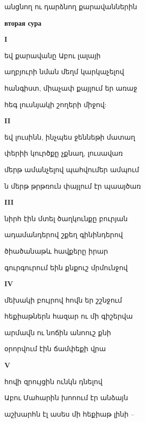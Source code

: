 անցնող ու դարձնող  քարավաններին


{\bf   вторая  сура}


\centerline  {\bf I}

եվ քարավանը Աբու լալայի 




աղբյուրի նման մեղմ կարկաչելով



հանգիստ, միաչափ   քայլում եր առաջ



հեգ լուսնյակի  շողերի միջով:



  \centerline {\bf II} 



եվ լուսինն, ինչպես ջեննեթի մատաղ  



փերիի կուրծքը  չքնաղ, լուսավառ



մերթ ամանչելով  պահվումեր ամպում



ն մերթ թրթռուն փայլում  էր պաայծառ


\centerline{ \bf III}

նիրհ էին մտել ծաղկունքը բուրյան 



ադամանդերով շքեղ գինինդերով



ծիածանաթև  հավքերը   իրար



գուրգուրում    եին քնքուշ  մրմունջով



\centerline {\bf  IV}



մեխակի բույրով հովն եր շշնջում




հեքիաթներն հազար  ու մի գիշերվա 





արմավն ու նոճին անոուշ քնի 



օրորվում էին ճամփեքի վրա  


\centerline {\bf V}


հովի զրույցին ունկն դնելով  



Աբու Մահարին խոոում  էր  անձայն



աշխարհն էլ ասես մի  հեքիաթ լինի -- 




